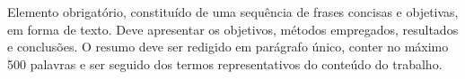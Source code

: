 
\noindent%
Elemento obrigatório, constituído de uma sequência de frases concisas e objetivas, em forma de texto.
Deve apresentar os objetivos, métodos empregados, resultados e conclusões. O resumo deve ser redigido em parágrafo único, conter no máximo 500 palavras e ser seguido dos termos representativos do conteúdo do trabalho. \lipsum[1]


